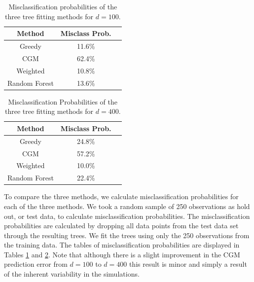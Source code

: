 \begin{table}[h]\footnotesize
\centering
  \begin{tabular}{| c | c | c }
  \hline 
Method & Misclass Prob.\\
      \hline 
Greedy &   11.6\%    \\
 CGM &     62.4\% \\
   Weighted & 10.8\%   \\
      Random Forest & 13.6\%   \\
      \hline
  \end{tabular}
    \caption[Misclassification probabilities for $d=100$.]{Misclassification probabilities of the three tree fitting methods for $d=100$.}
  \label{tab:sim_misclass1}
\centering
\end{table}

\begin{table}[h]\footnotesize
\centering
  \begin{tabular}{| c | c | c }
  \hline 
Method & Misclass Prob.\\
      \hline 
Greedy &  24.8\%     \\
 CGM &    57.2\% \\
   Weighted &  10.0\%  \\
    Random Forest   & 22.4\%   \\
      \hline
  \end{tabular}
    \caption[Misclassification Probabilities of the three tree fitting methods for $d=400$.]{Misclassification Probabilities of the three tree fitting methods for $d=400$.}
  \label{tab:sim_misclass2}
\centering
\end{table}


To compare the three methods, we calculate misclassification probabilities for each of the three methods. We took a random sample of 250 observations as hold out, or test data, to calculate misclassification probabilities. The misclassification probabilities are calculated by dropping all data points from the test data set through the resulting trees. We fit the trees using only the 250 observations from the training data. The tables of misclassification probabilities are displayed in Tables \ref{tab:sim_misclass1} and \ref{tab:sim_misclass2}. Note that although there is a slight improvement in the CGM prediction error from $d=100$ to $d=400$ this result is minor and simply a result of the inherent variability in the simulations. 

